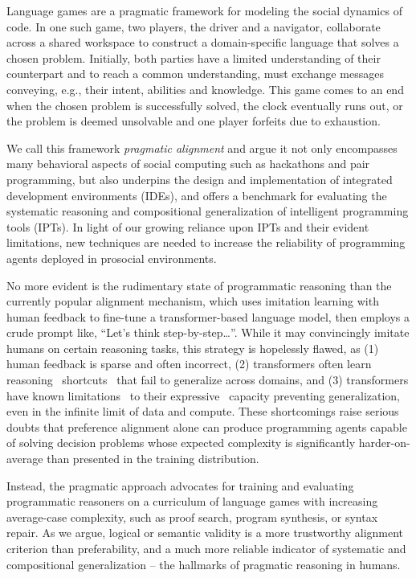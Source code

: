 \documentclass[sigplan,screen]{acmart}
\begin{document}
Language games are a pragmatic framework for modeling the social dynamics of code. In one such game, two players, the driver and a navigator, collaborate across a shared workspace to construct a domain-specific language that solves a chosen problem. Initially, both parties have a limited understanding of their counterpart and to reach a common understanding, must exchange messages conveying, e.g., their intent, abilities and knowledge. This game comes to an end when the chosen problem is successfully solved, the clock eventually runs out, or the problem is deemed unsolvable and one player forfeits due to exhaustion.

We call this framework \emph{pragmatic alignment} and argue it not only encompasses many behavioral aspects of social computing such as hackathons and pair programming, but also underpins the design and implementation of integrated development environments (IDEs), and offers a benchmark for evaluating the systematic reasoning and compositional generalization of intelligent programming tools (IPTs). In light of our growing reliance upon IPTs and their evident limitations, new techniques are needed to increase the reliability of programming agents deployed in prosocial environments.

No more evident is the rudimentary state of programmatic reasoning than the currently popular alignment mechanism, which uses imitation learning with human feedback to fine-tune a transformer-based language model, then employs a crude prompt like, ``Let's think step-by-step\ldots''. While it may convincingly imitate humans on certain reasoning tasks, this strategy is hopelessly flawed, as (1) human feedback is sparse and often incorrect, (2) transformers often learn reasoning~\cite{dziri2023faith} shortcuts~\cite{liu2022transformers} that fail to generalize across domains, and (3) transformers have known limitations~\cite{merrill2022saturated} to their expressive~\cite{chiang2023tighter} capacity preventing generalization, even in the infinite limit of data and compute. These shortcomings raise serious doubts that preference alignment alone can produce programming agents capable of solving decision problems whose expected complexity is significantly harder-on-average than presented in the training distribution.

Instead, the pragmatic approach advocates for training and evaluating programmatic reasoners on a curriculum of language games with increasing average-case complexity, such as proof search, program synthesis, or syntax repair. As we argue, logical or semantic validity is a more trustworthy alignment criterion than preferability, and a much more reliable indicator of systematic and compositional generalization -- the hallmarks of pragmatic reasoning in humans.
\end{document}
